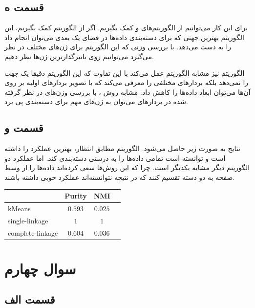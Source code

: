 \documentclass[12pt, a4paper]{article}
\begin{document}
\subsection*{قسمت ه}

برای این کار می‌توانیم از الگوریتم‌های  و  کمک بگیریم. اگر از الگوریتم
 کمک بگیریم، این الگوریتم بهترین جهتی که برای دسته‌بندی داده‌ها در فضای یک بعدی می‌توان انجام داد را
به دست می‌دهد. با بررسی وزنی که این الگوریتم برای ژن‌های مختلف در نظر می‌گیرد می‌توانیم روی تاثیرگذارترین
ژن‌ها نظر دهیم.

الگوریتم  نیز مشابه الگوریتم  عمل می‌کند با این تفاوت که این الگوریتم دقیقا یک جهت را
نمی‌دهد بلکه بردار‌های مختلفی را معرفی می‌کند که با تصویر بردار‌های اولیه بر روی آن‌ها می‌توان ابعاد داده‌ها
را کاهش داد. مشابه روش ، با بررسی وزن‌های در نظر گرفته شده در بردار‌های  می‌توان به
ژن‌های مهم برای دسته‌بندی پی برد.

\subsection*{قسمت و}

نتایج به صورت زیر حاصل می‌شود. الگوریتم  مطابق انتظار، بهترین عملکرد را داشته است
و توانسته است تمامی داده‌ها را به درستی دسته‌بندی کند. اما عملکرد دو الگوریتم دیگر مشابه یکدیگر است.
چرا که این روش‌ها سعی کرده‌اند داده‌ها را از وسط صفحه به دو دسته تقسیم کنند که در نتیجه نتوانسته‌اند عملکرد خوبی
داشته باشند.

\begin{latin}
\begin{table}[h]
    \centering
    \begin{tabular}{l|c|c|c}
        & Purity & NMI \\
        \toprule
        kMeans & $0.593$ & $0.025$ \\
        single-linkage & $1$ & $1$ \\
        complete-linkage & $0.604$ & $0.036$ \\
    \end{tabular}
\end{table}
\end{latin}


\clearpage
\thispagestyle{fancy}

\section*{سوال چهارم}

\subsection*{قسمت الف}
\end{document}
